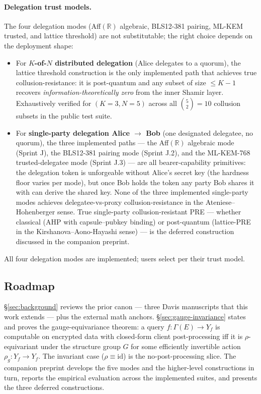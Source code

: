 \documentclass[11pt,letterpaper]{article}
\begin{document}
\paragraph{Delegation trust models.}
The four delegation modes (Aff$(\mathbb{R})$ algebraic,
BLS12-381 pairing, ML-KEM trusted, and lattice threshold) are
not substitutable; the right choice depends on the deployment
shape:

\begin{itemize}[nosep,leftmargin=*]
\item For \textbf{$K$-of-$N$ distributed delegation} (Alice
  delegates to a quorum), the lattice threshold construction is
  the only implemented path that achieves true collusion-resistance:
  it is post-quantum and any subset of size $\leq K-1$ recovers
  \emph{information-theoretically zero} from the inner Shamir
  layer. Exhaustively verified for $(K{=}3, N{=}5)$ across all
  $\binom{5}{2} = 10$ collusion subsets in the public test suite.
\item For \textbf{single-party delegation Alice $\to$ Bob} (one
  designated delegatee, no quorum), the three implemented paths ---
  the Aff$(\mathbb{R})$ algebraic mode (Sprint J), the BLS12-381
  pairing mode (Sprint J.2), and the ML-KEM-768 trusted-delegatee
  mode (Sprint J.3) --- are all bearer-capability primitives: the
  delegation token is unforgeable without Alice's secret key (the
  hardness floor varies per mode), but once Bob holds the token
  any party Bob shares it with can derive the shared key. None of
  the three implemented single-party modes achieves
  delegatee-vs-proxy collusion-resistance in the
  Ateniese--Hohenberger sense. True single-party collusion-resistant
  PRE --- whether classical (AHP with capsule--pubkey binding) or
  post-quantum (lattice-PRE in the
  Kirshanova--Aono-Hayashi sense) --- is the deferred construction
  discussed in the companion preprint.
\end{itemize}

All four delegation modes are implemented; users select per
their trust model.

\subsection{Roadmap}
\label{sec:intro:roadmap}

\S\ref{sec:background} reviews the prior canon --- three Davis
manuscripts that this work extends --- plus the external math
anchors. \S\ref{sec:gauge-invariance} states and proves the
gauge-equivariance theorem: a query
$f: \Gamma(E) \to Y_f$ is computable on encrypted data with
closed-form client post-processing iff it is $\rho$-equivariant
under the structure group $G$ for some efficiently invertible
action $\rho_g: Y_f \to Y_f$. The invariant case
($\rho \equiv \mathrm{id}$) is the no-post-processing slice. The
companion preprint develops the five modes and the higher-level
constructions in turn, reports the empirical evaluation across
the implemented suites, and presents the three deferred constructions.
\end{document}
